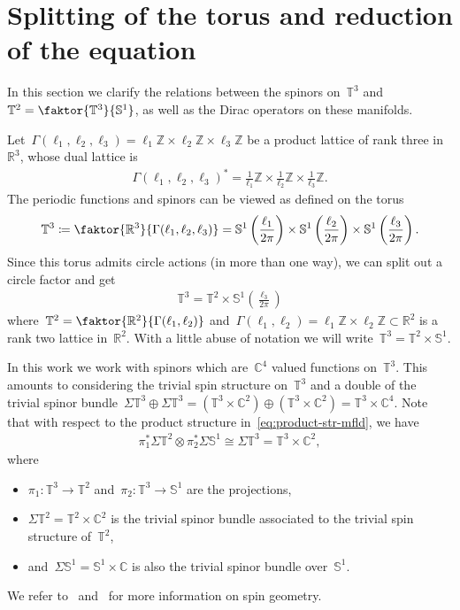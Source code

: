 \documentclass[10pt,a4paper]{amsart}
\newcommand{\R}{\mathbb{R}}
\newcommand{\C}{\mathbb{C}}
\newcommand{\T}{\mathbb{T}}
\newcommand{\sph}{\mathbb{S}}
\newcommand{\parenthesis}[1]{\left(#1\right)} %
\newcommand{\bZ}{\mathbb{Z}}
\begin{document}
\section{Splitting of the torus and reduction of the equation}\label{sect:splitting}

In this section we clarify the relations between the spinors on~$\T^3$ and~$\T^2=\faktor{\T^3}{\sph^1}$, as well as the Dirac operators on these manifolds. 

Let~$\Gamma(\ell_1,\ell_2,\ell_3)=\ell_1\mathbb{Z} \times \ell_2\mathbb{Z} \times \ell_3\mathbb{Z}$ be a product lattice of rank three in~$\R^3$, whose dual lattice is 
\begin{align}
    \Gamma(\ell_1,\ell_2,\ell_3)^*=\frac{1}{\ell_1}\bZ\times \frac{1}{\ell_2}\bZ \times \frac{1}{\ell_3}\bZ.
\end{align}
The periodic functions and spinors can be viewed as defined on the torus
\begin{align}
    \T^3\coloneqq \faktor{\R^3}{\Gamma(\ell_1,\ell_2,\ell_3)} 
    = \sph^1\parenthesis{\frac{\ell_1}{2\pi}} 
    \times \sph^1\parenthesis{\frac{\ell_2}{2\pi}}
    \times \sph^1\parenthesis{\frac{\ell_3}{2\pi}}.
\end{align}
Since this torus admits circle actions (in more than one way), we can split out a circle factor and get 
\begin{align}\label{eq:product-str-mfld}
    \T^3= \T^2\times \sph^1(\frac{\ell_3}{2\pi})
\end{align}
where~$\T^2=\faktor{\R^2}{\Gamma(\ell_1,\ell_2)}$ and~$\Gamma(\ell_1,\ell_2)=\ell_1\bZ\times \ell_2\bZ\subset \R^2$ is a rank two lattice in~$\R^2$.
With a little abuse of notation we will write~$\T^3=\T^2\times\sph^1$. 

In this work we work with spinors which are~$\C^4$ valued functions on~$\T^3$.
This amounts to considering the trivial spin structure on~$\T^3$ and a double of the trivial spinor bundle~$\Sigma \T^3 \oplus\Sigma \T^3=(\T^3\times \C^2)\oplus (\T^3\times\C^2)=\T^3\times \C^4$.
Note that with respect to the product structure in~\eqref{eq:product-str-mfld}, we have
\begin{align}\label{eq:splitting-spinor-bundles}
    \pi_1^*\Sigma\T^2\otimes\pi_2^*\Sigma\sph^1\cong\Sigma\T^3=\T^3\times\C^2,
\end{align}
where
\begin{itemize}
    \item $\pi_1\colon\T^3\to\T^2$ and~$\pi_2\colon\T^3\to\sph^1$ are the projections,
    \item $\Sigma\T^2=\T^2\times \C^2$ is the trivial spinor bundle associated to the trivial spin structure of~$\T^2$,
    \item and~$\Sigma\sph^1=\sph^1\times\C$ is also the trivial spinor bundle over~$\sph^1$.
\end{itemize}
We refer to~\cite{Ginoux2009Dirac} and~\cite{Lawson1989Spin} for more information on spin geometry. 
\end{document}

